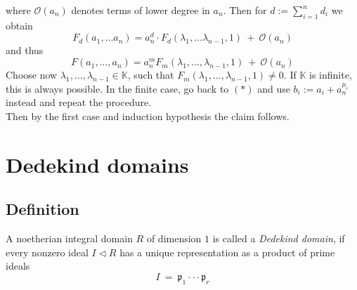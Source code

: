 \documentclass[12pt]{book}
\begin{document}
\begin{spacing}{1.3}
\begin{compactenum}
\begin{compactenum}
where $\mathcal{O}(a_n)$ denotes terms of lower degree in $a_n$. Then for $d:= \sum_{i=1}^n d_i$ we obtain
$$F_d(a_1, \ldots a_n)= a_n^d \cdot F_d(\lambda_1, \ldots \lambda_{n-1}, 1 ) \ + \ \mathcal{O}(a_n)$$
and thus
$$F(a_1, \ldots, a_n)=a_n^m F_m(\lambda_1, \ldots, \lambda_{n-1},1) \ + \ \mathcal{O}(a_n)$$
Choose now $\lambda_1, \ldots, \lambda_{n-1} \in \mathbb{K}$, such that $F_m(\lambda_1, \ldots, \lambda_{n-1},1) \neq 0$. If $\mathbb{K}$ is infinite, this is always possible. In the finite case, go back to $(*)$ and use $b_i:=a_i+a_n^{\mu_i}$ instead and repeat the procedure.\\
Then by the first case and induction hypothesis the claim follows.
\end{compactenum}
\end{compactenum}



\renewcommand*\thesection{§ \arabic{section}\quad }
\section{Dedekind domains}
\renewcommand*\thesection{\arabic{section}}

\subsection{Definition} %
A noetherian integral domain $R$ of dimension $1$ is called a \textit{Dedekind domain}, if every nonzero ideal $I \triangleleft R$ has a unique representation as a product of prime ideals
$$I \ = \ \mathfrak{p}_1 \cdot \cdot \cdot \mathfrak{p}_r$$


\end{spacing}
\end{document}
